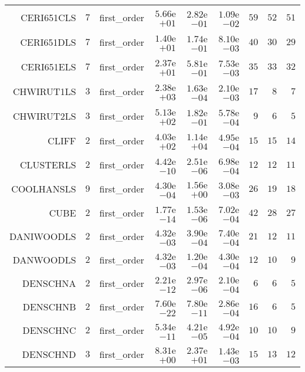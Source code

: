 \begin{longtable}{rrrrrrrrr}
CERI651CLS & \(     7\) & first\_order & \( 5.66\)e\(+01\) & \( 2.82\)e\(-01\) & \( 1.09\)e\(-02\) & \(    59\) & \(    52\) & \(    51\) \\
CERI651DLS & \(     7\) & first\_order & \( 1.40\)e\(+01\) & \( 1.74\)e\(-01\) & \( 8.10\)e\(-03\) & \(    40\) & \(    30\) & \(    29\) \\
CERI651ELS & \(     7\) & first\_order & \( 2.37\)e\(+01\) & \( 5.81\)e\(-01\) & \( 7.53\)e\(-03\) & \(    35\) & \(    33\) & \(    32\) \\
CHWIRUT1LS & \(     3\) & first\_order & \( 2.38\)e\(+03\) & \( 1.63\)e\(-04\) & \( 2.10\)e\(-03\) & \(    17\) & \(     8\) & \(     7\) \\
CHWIRUT2LS & \(     3\) & first\_order & \( 5.13\)e\(+02\) & \( 1.82\)e\(-01\) & \( 5.78\)e\(-04\) & \(     9\) & \(     6\) & \(     5\) \\
CLIFF & \(     2\) & first\_order & \( 4.03\)e\(+02\) & \( 1.14\)e\(+04\) & \( 4.95\)e\(-04\) & \(    15\) & \(    15\) & \(    14\) \\
CLUSTERLS & \(     2\) & first\_order & \( 4.42\)e\(-10\) & \( 2.51\)e\(-06\) & \( 6.98\)e\(-04\) & \(    12\) & \(    12\) & \(    11\) \\
COOLHANSLS & \(     9\) & first\_order & \( 4.30\)e\(-04\) & \( 1.56\)e\(+00\) & \( 3.08\)e\(-03\) & \(    26\) & \(    19\) & \(    18\) \\
CUBE & \(     2\) & first\_order & \( 1.77\)e\(-14\) & \( 1.53\)e\(-06\) & \( 7.02\)e\(-04\) & \(    42\) & \(    28\) & \(    27\) \\
DANIWOODLS & \(     2\) & first\_order & \( 4.32\)e\(-03\) & \( 3.90\)e\(-04\) & \( 7.40\)e\(-04\) & \(    21\) & \(    12\) & \(    11\) \\
DANWOODLS & \(     2\) & first\_order & \( 4.32\)e\(-03\) & \( 1.20\)e\(-04\) & \( 4.30\)e\(-04\) & \(    12\) & \(    10\) & \(     9\) \\
DENSCHNA & \(     2\) & first\_order & \( 2.21\)e\(-12\) & \( 2.97\)e\(-06\) & \( 2.10\)e\(-04\) & \(     6\) & \(     6\) & \(     5\) \\
DENSCHNB & \(     2\) & first\_order & \( 7.60\)e\(-22\) & \( 7.80\)e\(-11\) & \( 2.86\)e\(-04\) & \(    16\) & \(     6\) & \(     5\) \\
DENSCHNC & \(     2\) & first\_order & \( 5.34\)e\(-11\) & \( 4.21\)e\(-05\) & \( 4.92\)e\(-04\) & \(    10\) & \(    10\) & \(     9\) \\
DENSCHND & \(     3\) & first\_order & \( 8.31\)e\(+00\) & \( 2.37\)e\(+01\) & \( 1.43\)e\(-03\) & \(    15\) & \(    13\) & \(    12\) \\

\end{longtable}
